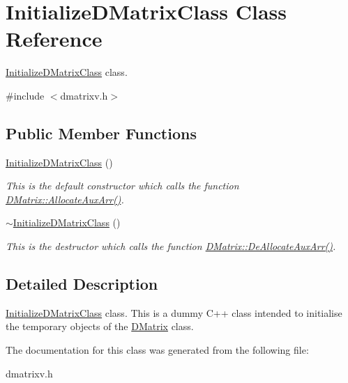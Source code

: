 \hypertarget{classInitializeDMatrixClass}{
\section{InitializeDMatrixClass Class Reference}
\label{classInitializeDMatrixClass}
}


\hyperlink{classInitializeDMatrixClass}{InitializeDMatrixClass} class.  




{\ttfamily \#include $<$dmatrixv.h$>$}

\subsection*{Public Member Functions}
\begin{DoxyCompactItemize}
\item 
\hypertarget{classInitializeDMatrixClass_a205e18726609139178de0663a5c8ccbc}{
\hyperlink{classInitializeDMatrixClass_a205e18726609139178de0663a5c8ccbc}{InitializeDMatrixClass} ()}
\label{classInitializeDMatrixClass_a205e18726609139178de0663a5c8ccbc}

\begin{DoxyCompactList}\small\item\em This is the default constructor which calls the function \hyperlink{classDMatrix_aadec35682639717d9bc698cfee3953ad}{DMatrix::AllocateAuxArr()}. \item\end{DoxyCompactList}\item 
\hypertarget{classInitializeDMatrixClass_ac77fb277a57018bb436d7487d877096c}{
\hyperlink{classInitializeDMatrixClass_ac77fb277a57018bb436d7487d877096c}{$\sim$InitializeDMatrixClass} ()}
\label{classInitializeDMatrixClass_ac77fb277a57018bb436d7487d877096c}

\begin{DoxyCompactList}\small\item\em This is the destructor which calls the function \hyperlink{classDMatrix_a6389bc3790f8b71dd59a8f2bd659fc27}{DMatrix::DeAllocateAuxArr()}. \item\end{DoxyCompactList}\end{DoxyCompactItemize}


\subsection{Detailed Description}
\hyperlink{classInitializeDMatrixClass}{InitializeDMatrixClass} class. This is a dummy C++ class intended to initialise the temporary objects of the \hyperlink{classDMatrix}{DMatrix} class. 

The documentation for this class was generated from the following file:\begin{DoxyCompactItemize}
\item 
dmatrixv.h\end{DoxyCompactItemize}
